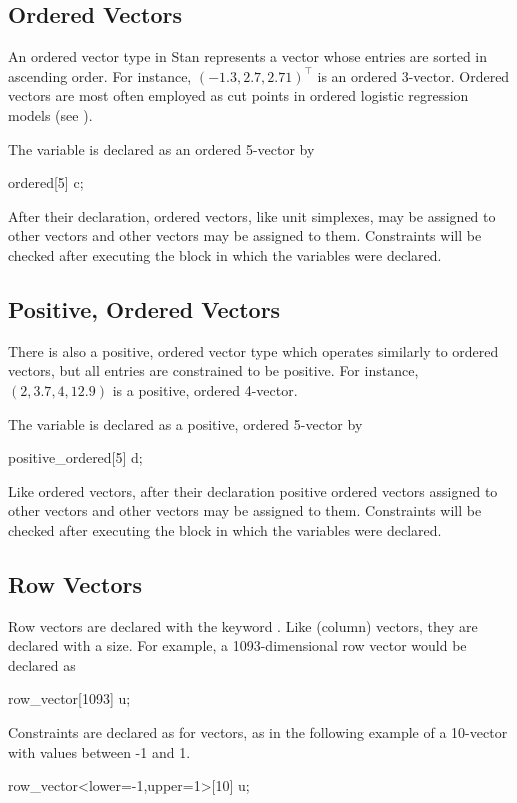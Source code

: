 \subsection{Ordered Vectors}

An ordered vector type in Stan represents a vector whose entries are
sorted in ascending order.  For instance, $(-1.3,2.7,2.71)^{\top}$ is
an ordered 3-vector.  Ordered vectors are most often employed as cut
points in ordered logistic regression models (see
).

The variable  is declared as an ordered 5-vector by
%
\begin{stancode}
ordered[5] c;
\end{stancode}
%
After their declaration, ordered vectors, like unit simplexes, may be
assigned to other vectors and other vectors may be assigned to them.
Constraints will be checked after executing the block in which the
variables were declared.


\subsection{Positive, Ordered Vectors}

There is also a positive, ordered vector type which operates similarly
to ordered vectors, but all entries are constrained to be positive.
For instance, $(2,3.7,4,12.9)$ is a positive, ordered 4-vector.

The variable  is declared as a positive, ordered 5-vector by
%
\begin{stancode}
positive_ordered[5] d;
\end{stancode}
%
Like ordered vectors, after their declaration positive ordered vectors
assigned to other vectors and other vectors may be assigned to them.
Constraints will be checked after executing the block in which the
variables were declared.

\subsection{Row Vectors}

Row vectors are declared with the keyword .
Like (column) vectors, they are declared with a size.  For example,
a 1093-dimensional row vector  would be declared as
%
\begin{stancode}
row_vector[1093] u;
\end{stancode}
%
Constraints are declared as for vectors, as in the following example
of a 10-vector with values between -1 and 1.
\begin{stancode}
row_vector<lower=-1,upper=1>[10] u;
\end{stancode}
%

